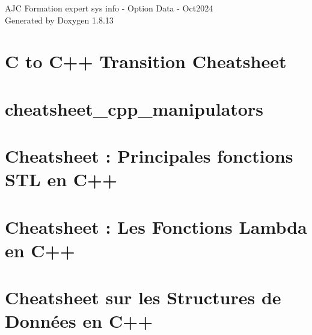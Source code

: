 \documentclass[twoside]{book}
\newcommand{\+}{\discretionary{\mbox{\scriptsize$\hookleftarrow$}}{}{}}
\newcommand{\clearemptydoublepage}{%
  \newpage{\pagestyle{empty}\cleardoublepage}%
}
\begin{document}
\hypersetup{pageanchor=false,
             bookmarksnumbered=true,
             pdfencoding=unicode
            }
\begin{titlepage}
\vspace*{7cm}
\begin{center}%
{\Large A\+JC Formation expert sys info -\/ Option Data -\/ Oct2024 }\\
\vspace*{1cm}
{\large Generated by Doxygen 1.8.13}\\
\end{center}
\end{titlepage}
\clearemptydoublepage
{}
\tableofcontents
\clearemptydoublepage
{}
\hypersetup{pageanchor=true}

\chapter{C to C++ Transition Cheatsheet}
\label{md_base_connaissances_Cpp_cheatsheet_c_to_cpp_cheatsheet}

\chapter{cheatsheet\+\_\+cpp\+\_\+manipulators}
\label{md_base_connaissances_Cpp_cheatsheet_cheatsheet_cpp_manipulators}

\chapter{Cheatsheet \+: Principales fonctions S\+TL en C++}
\label{md_base_connaissances_Cpp_cheatsheet_cheatsheet_fonctions_stl_cpp}

\chapter{Cheatsheet \+: Les Fonctions Lambda en C++}
\label{md_base_connaissances_Cpp_cheatsheet_cheatsheet_lambdas_cpp}

\chapter{Cheatsheet sur les Structures de Données en C++}
\label{md_base_connaissances_Cpp_cheatsheet_cheatsheet_structures_donnees_cpp}

\end{document}
